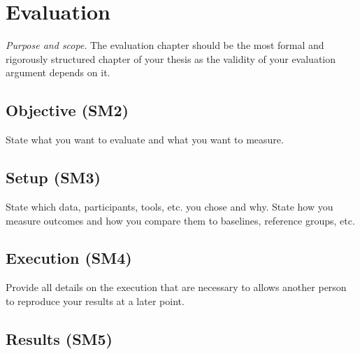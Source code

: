 \chapter{Evaluation}\label{sec:evaluation}

\emph{Purpose and scope}.
The evaluation chapter should be the most formal and rigorously structured chapter of your thesis as the validity of your evaluation argument depends on it.

\section{Objective (SM2)}\label{sec:evaluation:objective}

State what you want to evaluate and what you want to measure.

\section{Setup (SM3)}\label{sec:evaluation:setup}

State which data, participants, tools, etc. you chose and why.
State how you measure outcomes and how you compare them to baselines, reference groups, etc.

\section{Execution (SM4)}\label{sec:evaluation:execution}

Provide all details on the execution that are necessary to allows another person to reproduce your results at a later point.

\section{Results (SM5)}\label{sec:evaluation:results}

